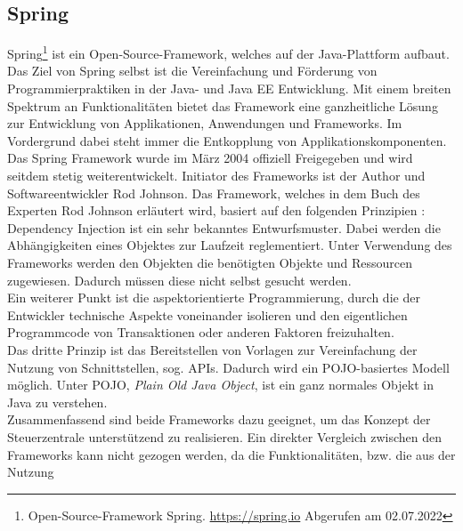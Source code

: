     \subsection{Spring}
    \label{subsec:springBootFramework}
        Spring\footnote{Open-Source-Framework Spring. \url{https://spring.io} Abgerufen am 02.07.2022} ist ein Open-Source-Framework, welches auf der Java-Plattform aufbaut. 
        Das Ziel von Spring selbst ist die Vereinfachung und Förderung von Programmierpraktiken in der Java- und Java EE Entwicklung. Mit einem breiten Spektrum an 
        Funktionalitäten bietet das Framework eine ganzheitliche Lösung zur Entwicklung von Applikationen, Anwendungen und Frameworks. Im Vordergrund dabei steht immer die 
        Entkopplung von Applikationskomponenten. Das Spring Framework wurde im März 2004 offiziell Freigegeben und wird seitdem stetig weiterentwickelt. 
        Initiator des Frameworks ist der Author und Softwareentwickler Rod Johnson. Das Framework, welches in dem Buch des Experten Rod Johnson erläutert wird, basiert auf 
        den folgenden Prinzipien \cite{johnson2004expert}: 
        \\
        \linebreak
        Dependency Injection ist ein sehr bekanntes Entwurfsmuster. Dabei werden die Abhängigkeiten eines Objektes zur Laufzeit reglementiert. Unter 
        Verwendung des Frameworks werden den Objekten die benötigten Objekte und Ressourcen zugewiesen. Dadurch müssen diese nicht selbst gesucht werden. 
        \\
        \linebreak
        Ein weiterer Punkt ist die aspektorientierte Programmierung, durch die der Entwickler technische Aspekte voneinander isolieren und den eigentlichen Programmcode 
        von Transaktionen oder anderen Faktoren freizuhalten. 
        \\
        \linebreak
        Das dritte Prinzip ist das Bereitstellen von Vorlagen zur Vereinfachung der Nutzung von Schnittstellen, sog. \acs{API}s. Dadurch wird ein POJO-basiertes Modell 
        möglich. Unter POJO, \textit{Plain Old Java Object}, ist ein ganz normales Objekt in Java zu verstehen. 
        \\
        \linebreak
        Zusammenfassend sind beide Frameworks dazu geeignet, um das Konzept der Steuerzentrale unterstützend zu realisieren. 
        Ein direkter Vergleich zwischen den Frameworks kann nicht gezogen werden, da die Funktionalitäten, bzw. die aus der Nutzung 
